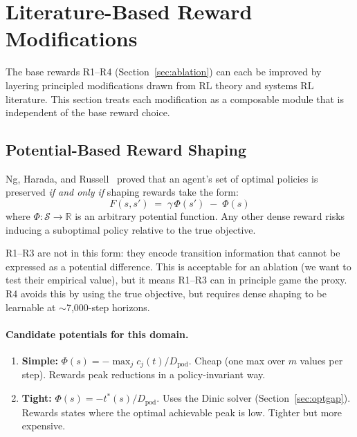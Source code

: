 \documentclass[11pt]{article}
\begin{document}
\section{Literature-Based Reward Modifications}
\label{sec:secondary}

The base rewards R1--R4 (Section~\ref{sec:ablation}) can each be improved
by layering principled modifications drawn from RL theory and systems RL
literature.  This section treats each modification as a composable module
that is independent of the base reward choice.

\subsection{Potential-Based Reward Shaping}
\label{sec:pbrs}

Ng, Harada, and Russell~\cite{ng1999pbrs} proved that an agent's set of
optimal policies is preserved \emph{if and only if} shaping rewards take
the form:
\begin{equation}
  F(s, s')
  \;=\;
  \gamma\,\Phi(s') \;-\; \Phi(s)
  \label{eq:pbrs}
\end{equation}
where $\Phi : \mathcal{S} \to \mathbb{R}$ is an arbitrary potential
function.  Any other dense reward risks inducing a suboptimal policy
relative to the true objective.

R1--R3 are not in this form: they encode transition information that
cannot be expressed as a potential difference.  This is acceptable for an
ablation (we want to test their empirical value), but it means R1--R3 can
in principle game the proxy.  R4 avoids this by using the true objective,
but requires dense shaping to be learnable at $\sim$7{,}000-step horizons.

\paragraph{Candidate potentials for this domain.}
\begin{enumerate}
  \item \textbf{Simple:} $\Phi(s) = -\max_j c_j(t) / D_{\text{pod}}$.
        Cheap (one max over $m$ values per step).  Rewards peak reductions
        in a policy-invariant way.
  \item \textbf{Tight:} $\Phi(s) = -t^*(s) / D_{\text{pod}}$.
        Uses the Dinic solver (Section~\ref{sec:optgap}).  Rewards states
        where the optimal achievable peak is low.  Tighter but more
        expensive.
\end{enumerate}
\end{document}
